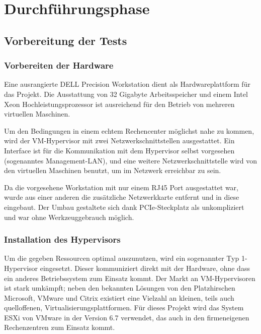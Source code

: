 \section{Durchführungsphase}
\label{sec:Durchführungsphase}

\subsection{Vorbereitung der Tests}
\label{sec:VorbereitungTests}

\subsubsection{Vorbereiten der Hardware}
\label{sec:VorbereitungHardware}
Eine ausrangierte DELL Precision Workstation dient als Hardwareplattform für das Projekt. Die Ausstattung von 32 Gigabyte Arbeitsspeicher und einem Intel Xeon Hochleistungsprozessor ist ausreichend für den Betrieb von mehreren virtuellen Maschinen.

Um den Bedingungen in einem \glqq{}echtem\grqq{} Rechencenter möglichst nahe zu kommen, wird der VM-Hypervisor mit zwei Netzwerkschnittstellen ausgestattet. Ein Interface ist für die Kommunikation mit dem Hypervisor selbst vorgesehen (sogenanntes Management-LAN), und eine weitere Netzwerkschnittstelle wird von den virtuellen Maschinen benutzt, um im Netzwerk erreichbar zu sein.

Da die vorgesehene Workstation mit nur einem RJ45 Port ausgestattet war, wurde aus einer anderen die zusätzliche Netzwerkkarte entfernt und in diese eingebaut. Der Umbau gestaltete sich dank PCIe-Steckplatz als unkompliziert und war ohne Werkzeuggebrauch möglich.

\subsubsection{Installation des Hypervisors}
\label{sec:InstallationHypervisor}
Um die gegeben Ressourcen optimal auszunutzen, wird ein sogenannter Typ 1-Hypervisor eingesetzt. Dieser kommuniziert direkt mit der Hardware, ohne dass ein anderes Betriebssystem zum Einsatz kommt. Der Markt an VM-Hypervisoren ist stark umkämpft; neben den bekannten Lösungen von den \glqq{}Platzhirschen\grqq{} Microsoft, VMware und Citrix existiert eine Vielzahl an kleinen, teils auch quelloffenen, Virtualisierungsplattformen. Für dieses Projekt wird das System \glqq{}ESXi\grqq{} von VMware in der Version 6.7 verwendet, das auch in den firmeneigenen Rechenzentren zum Einsatz kommt.

